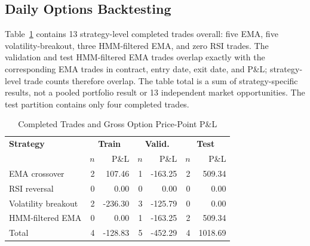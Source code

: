 \documentclass[journal]{IEEEtran}
\begin{document}
%

\subsection{Daily Options Backtesting}

Table~\ref{tab:backtest_trades} contains 13 strategy-level completed trades overall: five EMA, five volatility-breakout, three HMM-filtered EMA, and zero RSI trades. The validation and test HMM-filtered EMA trades overlap exactly with the corresponding EMA trades in contract, entry date, exit date, and P\&L; strategy-level trade counts therefore overlap. The table total is a sum of strategy-specific results, not a pooled portfolio result or 13 independent market opportunities. The test partition contains only four completed trades.

\begin{table}[!t]
\renewcommand{\arraystretch}{1.2}
\caption{Completed Trades and Gross Option Price-Point P\&L}
\label{tab:backtest_trades}
\centering
\begin{tabular}{lrrrrrr}
\toprule
\textbf{Strategy} & \multicolumn{2}{c}{\textbf{Train}} & \multicolumn{2}{c}{\textbf{Valid.}} & \multicolumn{2}{c}{\textbf{Test}} \\
& $n$ & P\&L & $n$ & P\&L & $n$ & P\&L \\
\midrule
EMA crossover        & 2 & 107.46  & 1 & -163.25 & 2 & 509.34 \\
RSI reversal         & 0 & 0.00    & 0 & 0.00    & 0 & 0.00 \\
Volatility breakout  & 2 & -236.30 & 3 & -125.79 & 0 & 0.00 \\
HMM-filtered EMA     & 0 & 0.00    & 1 & -163.25 & 2 & 509.34 \\
\midrule
Total                & 4 & -128.83 & 5 & -452.29 & 4 & 1018.69 \\
\bottomrule
\end{tabular}
\end{table}
\end{document}
